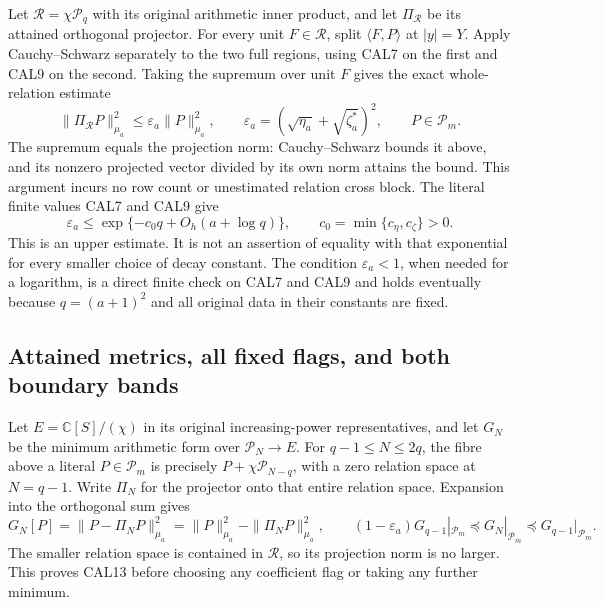 \documentclass[11pt,a4paper]{article}
\begin{document}
Let $\mathcal R=\chi\mathcal P_q$ with its original arithmetic
inner product, and let $\Pi_{\mathcal R}$ be its attained
orthogonal projector. For every unit $F\in\mathcal R$, split
$\langle F,P\rangle$ at $|y|=Y$. Apply Cauchy--Schwarz separately
to the two full regions, using CAL7 on the first and CAL9 on the
second. Taking the supremum over unit $F$ gives the exact
whole-relation estimate
\[
 \|\Pi_{\mathcal R}P\|_{\mu_a}^2\le\varepsilon_a\|P\|_{\mu_a}^2,
 \qquad
 \varepsilon_a=(\sqrt{\eta_a}+\sqrt{\zeta_a^*})^2,
 \qquad P\in\mathcal P_m.
 \tag{CAL11}
\]
The supremum equals the projection norm: Cauchy--Schwarz bounds it
above, and its nonzero projected vector divided by its own norm
attains the bound. This argument incurs no row count or unestimated
relation cross block. The literal finite values CAL7 and CAL9 give
\[
 \varepsilon_a\le
       \exp\{-c_0q+O_h(a+\log q)\},\qquad
 c_0=\min\{c_\eta,c_\zeta\}>0.
 \tag{CAL12}
\]
This is an upper estimate. It is not an assertion of equality with
that exponential for every smaller choice of decay constant.
The condition $\varepsilon_a<1$, when needed for a logarithm, is a
direct finite check on CAL7 and CAL9 and holds eventually because
$q=(a+1)^2$ and all original data in their constants are fixed.

\subsection{Attained metrics, all fixed flags, and both boundary bands}

Let $E=\mathbb C[S]/(\chi)$ in its original increasing-power
representatives, and let $G_N$ be the minimum arithmetic form over
$\mathcal P_N\to E$. For $q-1\le N\le2q$, the fibre above a
literal $P\in\mathcal P_m$ is precisely
$P+\chi\mathcal P_{N-q}$, with a zero relation space at $N=q-1$.
Write $\Pi_N$ for the projector onto that entire relation space.
Expansion into the orthogonal sum gives
\[
 G_N[P]=\|P-\Pi_NP\|_{\mu_a}^2
       =\|P\|_{\mu_a}^2-\|\Pi_NP\|_{\mu_a}^2,
 \qquad
 (1-\varepsilon_a)G_{q-1}|_{\mathcal P_m}
       \preceq G_N|_{\mathcal P_m}
       \preceq G_{q-1}|_{\mathcal P_m}.
 \tag{CAL13}
\]
The smaller relation space is contained in $\mathcal R$, so its
projection norm is no larger. This proves CAL13 before choosing
any coefficient flag or taking any further minimum.
\end{document}
